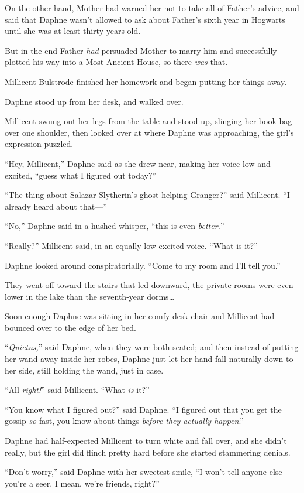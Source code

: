 On the other hand, Mother had warned her not to take all of Father’s advice, and said that Daphne wasn’t allowed to ask about Father’s sixth year in Hogwarts until she was at least thirty years old.

But in the end Father \emph{had} persuaded Mother to marry him and successfully plotted his way into a Most Ancient House, so there \emph{was} that.

Millicent Bulstrode finished her homework and began putting her things away.

Daphne stood up from her desk, and walked over.

Millicent swung out her legs from the table and stood up, slinging her book bag over one shoulder, then looked over at where Daphne was approaching, the girl’s expression puzzled.

“Hey, Millicent,” Daphne said as she drew near, making her voice low and excited, “guess what I figured out today?”

“The thing about Salazar Slytherin’s ghost helping Granger?” said Millicent. “I already heard about that—”

“No,” Daphne said in a hushed whisper, “this is even \emph{better.}”

“Really?” Millicent said, in an equally low excited voice. “What is it?”

Daphne looked around conspiratorially. “Come to my room and I’ll tell you.”

They went off toward the stairs that led downward, the private rooms were even lower in the lake than the seventh-year dorms…

Soon enough Daphne was sitting in her comfy desk chair and Millicent had bounced over to the edge of her bed.

“\emph{Quietus,}” said Daphne, when they were both seated; and then instead of putting her wand away inside her robes, Daphne just let her hand fall naturally down to her side, still holding the wand, just in case.

“All \emph{right!}” said Millicent. “What \emph{is} it?”

“You know what I figured out?” said Daphne. “I figured out that you get the gossip \emph{so} fast, you know about things \emph{before they actually happen}.”

Daphne had half-expected Millicent to turn white and fall over, and she didn’t really, but the girl did flinch pretty hard before she started stammering denials.

“Don’t worry,” said Daphne with her sweetest smile, “I won’t tell anyone else you’re a seer. I mean, we’re friends, right?”

